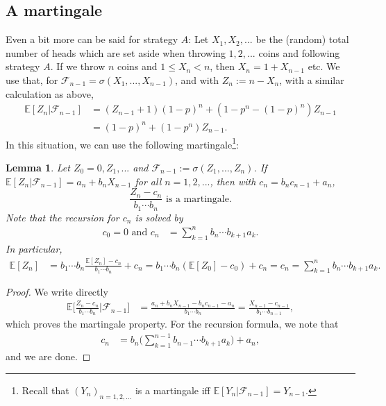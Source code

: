 \documentclass{article}
\newtheorem{lemma}[proposition]{Lemma}
\theoremstyle{definition}
\theoremstyle{step} \newtheorem{step}{Step}
\begin{document}
\subsection*{A martingale}
Even a bit more can be said for strategy $A$: Let $X_1, X_2,...$ be
the (random) total number of heads which are set aside when throwing
$1,2,...$ coins and following strategy $A$. If we throw $n$ coins and
$1\leq X_n < n$, then $X_n = 1 + X_{n-1}$ etc. We use that, for
$\mathcal F_{n-1} = \sigma(X_1,...,X_{n-1})$, and with $Z_n := n -
X_n$, with a similar calculation as above,
\begin{align*}
  \mathbb E[Z_n | \mathcal F_{n-1}] & = (Z_{n-1} + 1)(1-p)^n + (1 - p^n - (1-p)^n) Z_{n-1}
  \\ & = (1-p)^n + (1-p^n) Z_{n-1}.
\end{align*}
In this situation, we can use the following martingale\footnote{Recall
  that $(Y_n)_{n=1,2,...}$ is a martingale iff $\mathbb E[Y_n |
    \mathcal F_{n-1}] = Y_{n-1}$.}:

\begin{lemma}
  Let $Z_0 = 0, Z_1,...$ and $\mathcal F_{n-1} :=
  \sigma(Z_1,...,Z_n)$. If $\mathbb E[Z_n | \mathcal F_{n-1}] = a_n +
  b_n X_{n-1}$ for all $n = 1,2,...$, then with $c_n = b_n c_{n-1} + 
  a_n$,
  $$ \frac{Z_n - c_n}{b_1 \cdots b_n} \text{ is a martingale}.$$ Note
  that the recursion for $c_n$ is solved by 
  \begin{align*}
    c_0=0 \text{ and }c_n & = \sum_{k=1}^n b_n \cdots b_{k+1} a_k.
  \end{align*}
  In particular,
  \begin{align*}
    \mathbb E[Z_n] & = b_1 \cdots b_n \frac{\mathbb E[Z_n] - c_n}{b_1
      \cdots b_n} + c_n = b_1 \cdots b_n (\mathbb E[Z_0] - c_0) + c_n
    = c_n = \sum_{k=1}^n b_n \cdots b_{k+1} a_k.
  \end{align*}
\end{lemma}

\begin{proof}
  We write directly
  \begin{align*}
    \mathbb E\Big[ \frac{Z_n - c_n}{b_1 \cdots b_n} \Big| \mathcal
      F_{n-1}\Big] & = \frac{a_n + b_nX_{n-1} - b_nc_{n-1} - a_n}{b_1
      \cdots b_n} = \frac{X_{n-1} - c_{n-1}}{b_1
      \cdots b_{n-1}},
  \end{align*}
  which proves the martingale property. For the recursion formula, we
  note that
  \begin{align*}
    c_n & = b_n \Big(\sum_{k=1}^{n-1} b_{n-1} \cdots b_{k+1} a_k\Big) +
    a_n,
  \end{align*}
  and we are done.
\end{proof}
\end{document}

